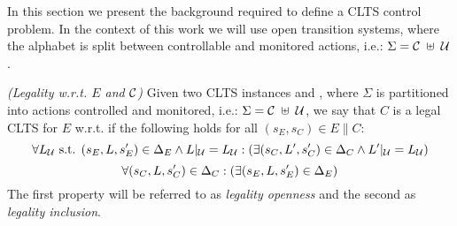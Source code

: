 In this section we present the background required to define a CLTS control problem.  In the context of this work we will use open transition systems, where the alphabet is split between controllable and monitored actions, i.e.: $\Sigma=\mathcal{C} \; \uplus \;\mathcal{U}$.



\begin{definition}
	\label{def:legal_clts} \emph{(Legality w.r.t. $E$ and $\mathcal{C}$)} 
	Given two CLTS instances  and , where $\Sigma$ is partitioned into actions controlled and monitored, i.e.: $\Sigma=\mathcal{C} \; \uplus \;\mathcal{U}$, we say that $C$ is a legal CLTS for $E$ w.r.t. \controlSet if the following holds for all $(s_E,s_C) \in E \parallel C$:
	\[\forall L_{\mathcal{U}}\text{ s.t. }  (s_E, L, s'_E) \in \Delta_E \wedge L|_{\mathcal{U}} = L_{\mathcal{U}}:( \exists (s_C, L', s'_C) \in \Delta_C \wedge L'|_{\mathcal{U}} = L_{\mathcal{U}})\]
	\[\forall (s_C, L, s'_C) \in \Delta_C:( \exists (s_E, L, s'_E) \in \Delta_E)\]
	The first property will be referred to as \emph{legality openness} and the second as \emph{legality inclusion}.
\end{definition}

